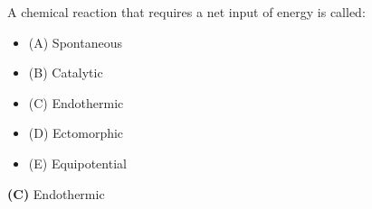

A chemical reaction that requires a net input of energy is called:

\begin{itemize}
\item{(A)} Spontaneous
\vskip 5pt 
\item{(B)} Catalytic
\vskip 5pt 
\item{(C)} Endothermic
\vskip 5pt 
\item{(D)} Ectomorphic
\vskip 5pt 
\item{(E)} Equipotential
\end{itemize}







{\bf (C)} Endothermic
 










